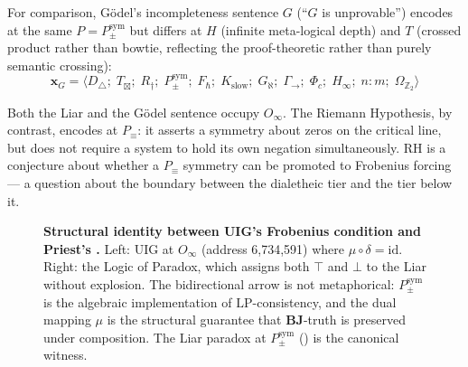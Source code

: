 \documentclass[12pt,a4paper]{article}
\newcommand{\xvec}{\mathbf{x}}
\newcommand{\Phic}{\Phi_c}
\newcommand{\Ppms}{P_{\pm}^{\text{sym}}}
\newcommand{\Oinf}{O_\infty}
\newcommand{\OmegaZtwo}{\Omega_{\mathbb{Z}_2}}
\newcommand{\GamSeq}{\Gamma_{\to}}
\newcommand{\Tbox}{T_{\mathord{\boxtimes}}}
\newcommand{\glp}{\text{LP}}
\newcommand{\both}{\mathbf{BJ}}
\begin{document}
For comparison, G\"{o}del's incompleteness sentence $G$ (``$G$ is unprovable'')
encodes at the same $P = \Ppms$ but differs at $H$ (infinite meta-logical
depth) and $T$ (crossed product rather than bowtie, reflecting the
proof-theoretic rather than purely semantic crossing):
\begin{equation}
  \xvec_{G} = \langle D_\triangle;\; \Tbox;\; R_\dagger;\; \Ppms;\;
  F_\hbar;\; K_\text{slow};\; G_\aleph;\; \GamSeq;\; \Phic;\; H_\infty;\;
  n{:}m;\; \OmegaZtwo \rangle
  \label{eq:godel_encoding}
\end{equation}

\noindent
Both the Liar and the G\"{o}del sentence occupy $\Oinf$.  The Riemann
Hypothesis, by contrast, encodes at $P_\equiv$: it asserts a symmetry
about zeros on the critical line, but does not require a system to hold
its own negation simultaneously.  RH is a conjecture about whether a
$P_\equiv$ symmetry can be promoted to Frobenius forcing --- a question
about the boundary between the dialetheic tier and the tier below it.

\begin{figure}[H]
\centering
{}
\caption{\textbf{Structural identity between UIG's Frobenius condition
and Priest's \glp.} Left: UIG at $\Oinf$ (address 6,734,591) where
$\mu \circ \delta = \mathrm{id}$. Right: the Logic of Paradox, which
assigns both $\top$ and $\bot$ to the Liar without explosion. The
bidirectional arrow is not metaphorical: $\Ppms$ is the algebraic
implementation of $\glp$-consistency, and the dual mapping $\mu$
is the structural guarantee that $\both$-truth is preserved under
composition. The Liar paradox at $\Ppms$ ()
is the canonical witness.}
\label{fig:htt_lp_duality}
\end{figure}
\end{document}
